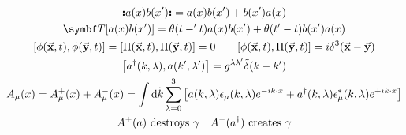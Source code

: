 \begin{gather*}
        \nord{a(x)b(x')} = a(x)b(x') + b(x')a(x)
        \\
        \Tordp{a(x)b(x')} = \theta(t-'t)a(x)b(x') + \theta(t'-t)b(x')a(x)
        \\
        \qty[\phi(\va{x},t),\phi(\va{y},t)] = \qty[\Pi(\va{x},t),\Pi(\va{y},t)] = 0
        \qquad
        \qty[\phi(\va{x},t),\Pi(\va{y},t)] = i\delta^3\qty(\va{x}-\va{y})
        \\
        \qty[a^\dagger\qty(k,\lambda),a\qty(k',\lambda')]
        = g^{\lambda\lambda'}\Tilde{\delta}\qty(k-k')
        \\
        A_\mu(x)
        = A_\mu^+(x) + A_\mu^-(x)
        = \int\dd{\Tilde{k}}\sum_{\lambda=0}^3 \qty[a(k,\lambda)\epsilon_\mu(k,\lambda)e^{-ik\cdot x} + a^\dagger(k,\lambda)\epsilon_\mu^*(k,\lambda)e^{+ik\cdot x}]
        \\
        A^+(a) \text{ destroys } \ce{\gamma}
        \quad
        A^-(a^\dagger) \text{ creates } \ce{\gamma}
\end{gather*}
